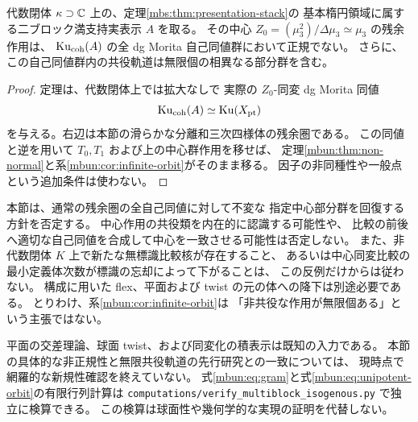 \begin{corollary}[非可換二ブロック幾何点への移送]
\label{mbun:cor:nc-non-normal}
代数閉体 $\kappa\supset\mathbb C$ 上の、定理\ref{mbs:thm:presentation-stack}の
基本楕円領域に属する二ブロック満支持実表示 $A$ を取る。
その中心 $Z_0=(\mu_3^2)/\Delta\mu_3\simeq\mu_3$ の残余作用は、
$\operatorname{Ku}_{\mathrm{coh}}(A)$ の全 dg Morita 自己同値群において正規でない。
さらに、この自己同値群内の共役軌道は無限個の相異なる部分群を含む。
\end{corollary}
\begin{proof}
定理は、代数閉体上では拡大なしで
実際の $Z_0$-同変 dg Morita 同値
\[
 \operatorname{Ku}_{\mathrm{coh}}(A)\simeq\operatorname{Ku}(X_{\mathrm{pt}})
\]
を与える。右辺は本節の滑らかな分離和三次四様体の残余圏である。
この同値と逆を用いて $T_0,T_1$ および上の中心群作用を移せば、
定理\ref{mbun:thm:non-normal}と系\ref{mbun:cor:infinite-orbit}がそのまま移る。
因子の非同種性や一般点という追加条件は使わない。
\end{proof}

\begin{remark}[標識の忘却について得られたことと残ること]
\label{mbun:rem:scope}
本節は、通常の残余圏の全自己同値に対して不変な
指定中心部分群を回復する方針を否定する。
中心作用の共役類を内在的に認識する可能性や、
比較の前後へ適切な自己同値を合成して中心を一致させる可能性は否定しない。
また、非代数閉体 $K$ 上で新たな無標識比較核が存在すること、
あるいは中心同変比較の最小定義体次数が標識の忘却によって下がることは、
この反例だけからは従わない。
構成に用いた flex、平面および twist の元の体への降下は別途必要である。
とりわけ、系\ref{mbun:cor:infinite-orbit}は
「非共役な作用が無限個ある」という主張ではない。

平面の交差理論、球面 twist、および同変化の積表示は既知の入力である。
本節の具体的な非正規性と無限共役軌道の先行研究との一致については、
現時点で網羅的な新規性確認を終えていない。
式\eqref{mbun:eq:gram}と式\eqref{mbun:eq:unipotent-orbit}の有限行列計算は
\texttt{computations/verify\_multiblock\_isogenous.py} で独立に検算できる。
この検算は球面性や幾何学的な実現の証明を代替しない。
\end{remark}
